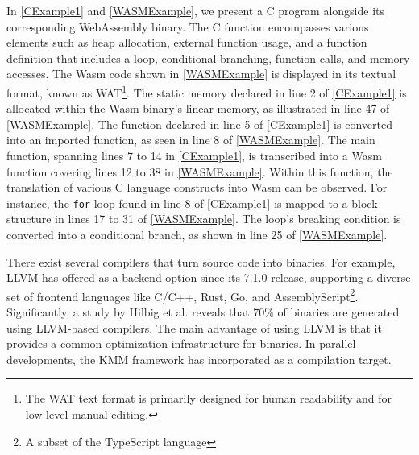 \begin{minipage}[h]{0.9\textwidth}
    \begin{minipage}[t]{1.0\linewidth}
    
    \end{minipage}
\end{minipage}


In \autoref{CExample1} and \autoref{WASMExample}, we present a C program alongside its corresponding WebAssembly binary. 
The C function encompasses various elements such as heap allocation, external function usage, and a function definition that includes a loop, conditional branching, function calls, and memory accesses.
The Wasm code shown in \autoref{WASMExample} is displayed in its textual format, known as WAT\footnote{The WAT text format is primarily designed for human readability and for low-level manual editing.}.
The static memory declared in line 2 of \autoref{CExample1} is allocated within the Wasm binary's linear memory, as illustrated in line 47 of \autoref{WASMExample}.
The function declared in line 5 of \autoref{CExample1} is converted into an imported function, as seen in line 8 of \autoref{WASMExample}.
The main function, spanning lines 7 to 14 in \autoref{CExample1}, is transcribed into a Wasm function covering lines 12 to 38 in \autoref{WASMExample}. Within this function, the translation of various C language constructs into Wasm can be observed.
For instance, the \texttt{for} loop found in line 8 of \autoref{CExample1} is mapped to a block structure in lines 17 to 31 of \autoref{WASMExample}. 
The loop's breaking condition is converted into a conditional branch, as shown in line 25 of \autoref{WASMExample}.






There exist several compilers that turn source code into \Wasm binaries. 
For example, LLVM has offered \Wasm as a backend option since its 7.1.0 release, supporting a diverse set of frontend languages like C/C++, Rust, Go, and AssemblyScript\footnote{A subset of the TypeScript language}.
Significantly, a study by Hilbig et al. reveals that 70\% of \Wasm binaries are generated using LLVM-based compilers. 
The main advantage of using LLVM is that it provides a common optimization infrastructure for \Wasm binaries.
In parallel developments, the KMM framework has incorporated \Wasm as a compilation target.


